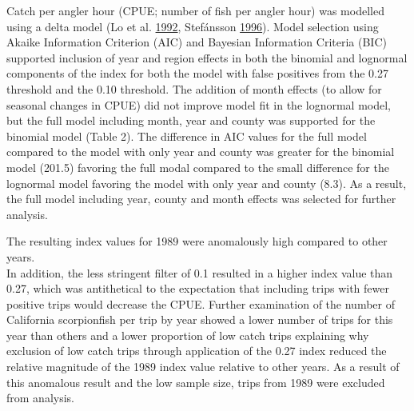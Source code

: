 \documentclass[12pt,]{article}
\begin{document}
Catch per angler hour (CPUE; number of fish per angler hour) was
modelled using a delta model (Lo et al.
\protect\hyperlink{ref-Lo1992}{1992}, Stefánsson
\protect\hyperlink{ref-Stefansson1996}{1996}). Model selection using
Akaike Information Criterion (AIC) and Bayesian Information Criteria
(BIC) supported inclusion of year and region effects in both the
binomial and lognormal components of the index for both the model with
false positives from the 0.27 threshold and the 0.10 threshold. The
addition of month effects (to allow for seasonal changes in CPUE) did
not improve model fit in the lognormal model, but the full model
including month, year and county was supported for the binomial model
(Table 2). The difference in AIC values for the full model compared to
the model with only year and county was greater for the binomial model
(201.5) favoring the full modal compared to the small difference for the
lognormal model favoring the model with only year and county (8.3). As a
result, the full model including year, county and month effects was
selected for further analysis.

The resulting index values for 1989 were anomalously high compared to
other years.\\
In addition, the less stringent filter of 0.1 resulted in a higher index
value than 0.27, which was antithetical to the expectation that
including trips with fewer positive trips would decrease the CPUE.
Further examination of the number of California scorpionfish per trip by
year showed a lower number of trips for this year than others and a
lower proportion of low catch trips explaining why exclusion of low
catch trips through application of the 0.27 index reduced the relative
magnitude of the 1989 index value relative to other years. As a result
of this anomalous result and the low sample size, trips from 1989 were
excluded from analysis.
\end{document}
